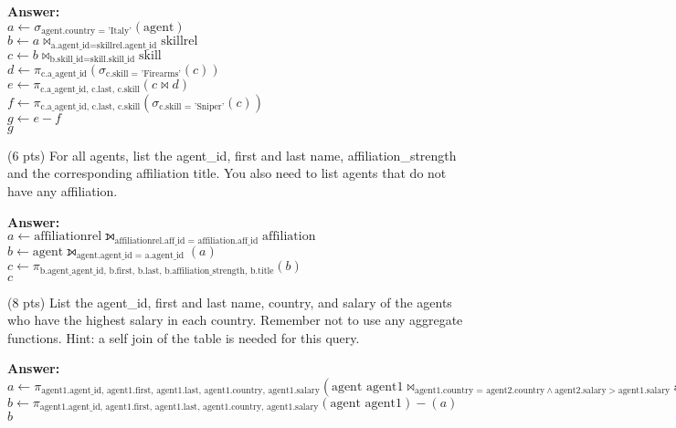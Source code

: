 \begin{questions}
\textbf{Answer:} \\
$a \leftarrow \sigma_{\text{agent.country = 'Italy'}} (\text{agent})$\\
$b \leftarrow a \bowtie_{\text{a.agent\_id} = \text{skillrel.agent\_id}} \text{skillrel}$\\
$c \leftarrow b \bowtie_{\text{b.skill\_id} = \text{skill.skill\_id}} \text{skill}$\\
$d \leftarrow \pi_{\text{c.a_agent\_id}} (\sigma_{\text{c.skill = 'Firearms'}}(c))$\\
$e \leftarrow \pi_{\text{c.a_agent\_id, c.last, c.skill}} (c \bowtie d)$\\
$f \leftarrow \pi_{\text{c.a_agent\_id, c.last, c.skill}} (\sigma_{\text{c.skill = 'Sniper'}}(c))$\\
$g \leftarrow e - f$\\
$g$


\vspace{15 mm}

\question (6 pts) For all agents, list the agent\_id, first and last name, affiliation\_strength and the corresponding affiliation title. You also need to list agents that do not have any affiliation.

\textbf{Answer:}  \\
$a \leftarrow \text{affiliationrel} \leftouterjoin_{\text{affiliationrel.aff_id = affiliation.aff_id}} \text{affiliation}$\\
$b \leftarrow \text{agent} \leftouterjoin_{\text{agent.agent_id = a.agent_id}}(a)$\\
$c \leftarrow \pi_{\text{b.agent_agent_id, b.first, b.last, b.affiliation_strength, b.title}}(b)$\\
$c$

\vspace{15 mm}

\question (8 pts) List the agent\_id, first and last name, country, and salary of the agents who have the highest salary in each country. 
Remember not to use any aggregate functions. Hint: a self join of the table is needed for this query.

\textbf{Answer:} 
$a \leftarrow \pi_{\text{agent1.agent_id, agent1.first, agent1.last, agent1.country, agent1.salary}} (\text{agent agent1} \bowtie_{\text{agent1.country = agent2.country} \land \text{agent2.salary} > \text{agent1.salary}} \text{agent agent2})$\\
$b \leftarrow \pi_{\text{agent1.agent_id, agent1.first, agent1.last, agent1.country, agent1.salary}} (\text{agent agent1}) - (a)$\\
$b$




\end{questions}

